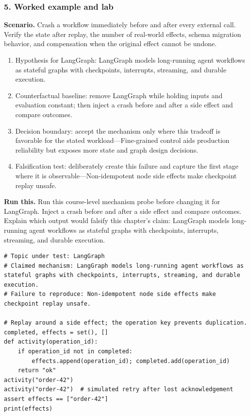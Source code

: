 \subsubsection*{5. Worked example and lab}
\textbf{Scenario.} Crash a workflow immediately before and after every external call. Verify the state after replay, the number of real-world effects, schema migration behavior, and compensation when the original effect cannot be undone.
\begin{enumerate}
\item Hypothesis for LangGraph: LangGraph models long-running agent workflows as stateful graphs with checkpoints, interrupts, streaming, and durable execution.
\item Counterfactual baseline: remove LangGraph while holding inputs and evaluation constant; then inject a crash before and after a side effect and compare outcomes.
\item Decision boundary: accept the mechanism only where this tradeoff is favorable for the stated workload—Fine-grained control aids production reliability but exposes more state and graph design decisions.
\item Falsification test: deliberately create this failure and capture the first stage where it is observable—Non-idempotent node side effects make checkpoint replay unsafe.
\end{enumerate}
\textbf{Run this.} Run this course-level mechanism probe before changing it for LangGraph. Inject a crash before and after a side effect and compare outcomes. Explain which output would falsify this chapter's claim: LangGraph models long-running agent workflows as stateful graphs with checkpoints, interrupts, streaming, and durable execution.
\begin{Verbatim}[fontsize=\scriptsize]
# Topic under test: LangGraph
# Claimed mechanism: LangGraph models long-running agent workflows as stateful graphs with checkpoints, interrupts, streaming, and durable execution.
# Failure to reproduce: Non-idempotent node side effects make checkpoint replay unsafe.

# Replay around a side effect; the operation key prevents duplication.
completed, effects = set(), []
def activity(operation_id):
    if operation_id not in completed:
        effects.append(operation_id); completed.add(operation_id)
    return "ok"
activity("order-42")
activity("order-42")  # simulated retry after lost acknowledgement
assert effects == ["order-42"]
print(effects)
\end{Verbatim}
